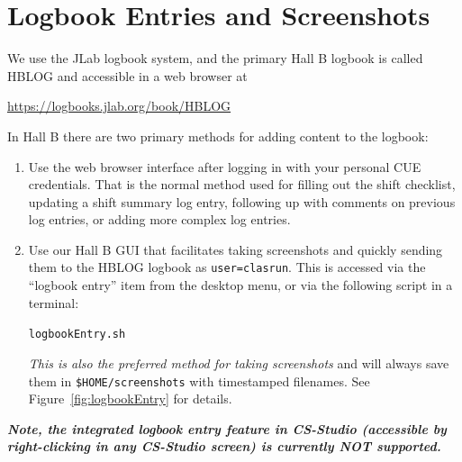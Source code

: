 \documentclass[amsmath,amssymb,notitlepage,11pt]{revtex4}
\begin{document}
\section{Logbook Entries and Screenshots}\label{sec:logentry}
We use the JLab logbook system, and the primary Hall B logbook is called HBLOG and accessible in a web browser at
\begin{center}\url{https://logbooks.jlab.org/book/HBLOG}\end{center}
In Hall B there are two primary methods for adding content to the logbook:
\begin{enumerate}
\item Use the web browser interface after logging in with your personal CUE credentials.  That is the normal method used for filling out the shift checklist, updating a shift summary log entry, following up with comments on previous log entries, or adding more complex log entries.
\item Use our Hall B GUI that facilitates taking screenshots and quickly sending them to the HBLOG logbook as \texttt{user=clasrun}.  This is accessed via the ``logbook entry'' item from the desktop menu, or via the following script in a terminal:
\begin{center}\texttt{logbookEntry.sh}\end{center}
    {\em This is also the preferred method for taking screenshots} and will always save them in \texttt{\$HOME/screenshots} with timestamped filenames.  See Figure~\ref{fig:logbookEntry} for details.
\end{enumerate}
{\bf\em Note, the integrated logbook entry feature in CS-Studio (accessible by right-clicking in any CS-Studio screen) is currently NOT supported.} 
\end{document}

